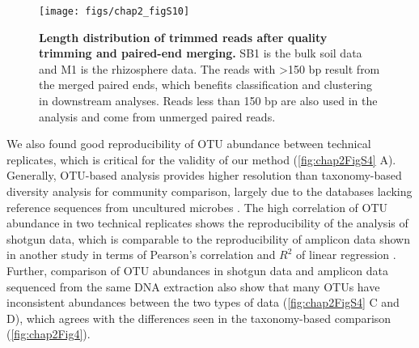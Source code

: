 \documentclass[]{msu-thesis}
\begin{document}
\begin{figure}[tbph!]
  \centering
  \texttt{[image: figs/chap2\_figS10]}
  \caption[Length distribution of trimmed reads after quality trimming and paired-end merging]{\textbf{Length distribution of trimmed reads after quality trimming and paired-end merging.} SB1 is the bulk soil data and M1 is the rhizosphere data. The reads with >150 bp result from the merged paired ends, which benefits classification and clustering in downstream analyses. Reads less than 150 bp are also used in the analysis and come from unmerged paired reads.}
  \label{fig:chap2FigS10}
\end{figure}

We also found good reproducibility of OTU abundance between technical replicates, which is critical for the validity of our method (\cref{fig:chap2FigS4} A). Generally, OTU-based analysis provides higher resolution than taxonomy-based diversity analysis for community comparison, largely due to the databases lacking reference sequences from uncultured microbes \cite{schloss_assessing_2011}. The high correlation of OTU abundance in two technical replicates shows the reproducibility of the analysis of shotgun data, which is comparable to the reproducibility of amplicon data shown in another study in terms of Pearson’s correlation and $R^2$ of linear regression \cite{lundberg_defining_2012}. Further, comparison of OTU abundances in shotgun data and amplicon data sequenced from the same DNA extraction also show that many OTUs have inconsistent abundances between the two types of data (\cref{fig:chap2FigS4} C and D), which agrees with the differences seen in the taxonomy-based comparison (\cref{fig:chap2Fig4}).
\end{document}
